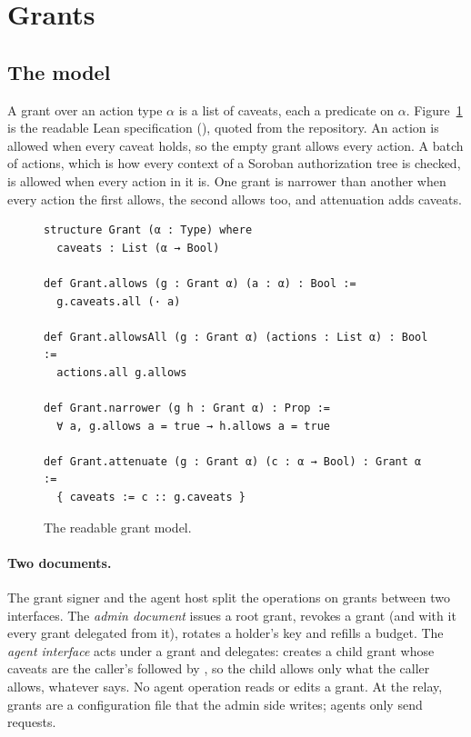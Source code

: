 \section{Grants}\label{sec:grants}

\subsection{The model}

A grant over an action type $\alpha$ is a list of caveats, each a predicate on
$\alpha$. Figure~\ref{fig:model} is the readable Lean specification
(), quoted from the repository. An
action is allowed when every caveat holds, so the empty grant allows every
action. A batch of actions, which is how every context of a Soroban
authorization tree is checked, is allowed when every action in it is. One
grant is narrower than another when every action the first allows, the second
allows too, and attenuation adds caveats.

\begin{figure}[t]
\begin{lstlisting}[language=Lean]
structure Grant (α : Type) where
  caveats : List (α → Bool)

def Grant.allows (g : Grant α) (a : α) : Bool :=
  g.caveats.all (· a)

def Grant.allowsAll (g : Grant α) (actions : List α) : Bool :=
  actions.all g.allows

def Grant.narrower (g h : Grant α) : Prop :=
  ∀ a, g.allows a = true → h.allows a = true

def Grant.attenuate (g : Grant α) (c : α → Bool) : Grant α :=
  { caveats := c :: g.caveats }
\end{lstlisting}
\caption{The readable grant model.}\label{fig:model}
\end{figure}

\paragraph{Two documents.} The grant signer and the agent host split the
operations on grants between two interfaces. The \emph{admin document}
issues a root grant, revokes a grant (and with it every grant delegated from
it), rotates a holder's key and refills a budget. The \emph{agent interface}
acts under a grant and delegates:  creates a child grant
whose caveats are the caller's followed by , so the child allows
only what the caller allows, whatever  says. No agent operation
reads or edits a grant. At the relay, grants are a configuration file that
the admin side writes; agents only send requests.


